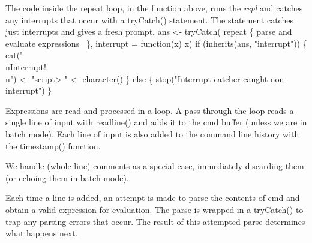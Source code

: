 \documentclass[a4paper]{article}%
\begin{document}
\eatline
{}\nwendcode{}\nwdocspar
The code inside the {\Tt{}repeat\nwendquote} loop, in the function above, runs
the \emph{repl} and catches any interrupts that occur with a
{\Tt{}tryCatch()\nwendquote} statement.  The statement catches just interrupts and
gives a fresh prompt.
\nwenddocs{}\endmoddef\nwstartdeflinemarkup{}\nwenddeflinemarkup
ans <- tryCatch(
    repeat \{
        \LA{}parse and evaluate expressions~{\nwtagstyle{}}\RA{}
    \}, interrupt = function(x) x)
if (inherits(ans, "interrupt")) \{
    cat("\\nInterrupt!\\n")
     <- "script> "
     <- character()
\} else \{
    stop("Interrupt catcher caught non-interrupt")
\}
\nwendcode{}\nwdocspar

Expressions are read and processed in a loop. A pass through the loop
reads a single line of input with {\Tt{}readline()\nwendquote} and adds it to the
{\Tt{}cmd\nwendquote} buffer (unless we are in batch mode).  
Each line of input is also added to the command line history 
with the {\Tt{}timestamp()\nwendquote} function.

We handle (whole-line) comments as a special case,
immediately discarding them
(or echoing them in batch mode).

Each time a line is added, an attempt is made to
parse the contents of {\Tt{}cmd\nwendquote} and obtain a valid expression for
evaluation. The parse is wrapped in a {\Tt{}tryCatch()\nwendquote} to trap any
parsing errors that occur.  The result of this attempted parse
determines what happens next.
\end{document}
